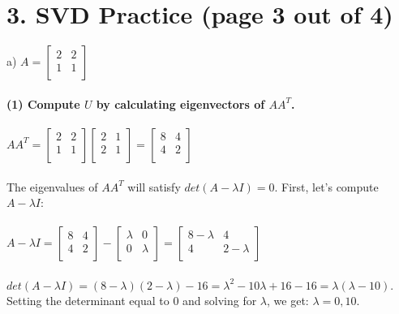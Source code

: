 \documentclass[11pt]{article}
\begin{document}
\section*{3. SVD Practice (page 3 out of 4)}
a) $ A = \begin{bmatrix}
2 & 2 \\
1 & 1 \\
\end{bmatrix} $ \\\\
\textbf{(1) Compute $U$ by calculating eigenvectors of $AA^T$.}
\\\\
$AA^T = \begin{bmatrix}
2 & 2 \\
1 & 1 \\
\end{bmatrix} \begin{bmatrix}
2 & 1 \\
2 & 1 \\
\end{bmatrix} = \begin{bmatrix}
8 & 4 \\
4 & 2 \\
\end{bmatrix} $ \\\\
The eigenvalues of $AA^T$ will satisfy $det(A - \lambda I ) = 0$. First, let's compute $A - \lambda I$: \\\\
$ A - \lambda I = \begin{bmatrix}
8 & 4 \\
4 & 2 \\
\end{bmatrix} - \begin{bmatrix}
\lambda & 0 \\
0 & \lambda \\
\end{bmatrix} = \begin{bmatrix}
8 - \lambda & 4 \\
4 & 2 - \lambda \\
\end{bmatrix}$ \\\\
$det(A - \lambda I) = (8 - \lambda) (2 - \lambda) - 16 = \lambda^2 - 10\lambda + 16 - 16 = \lambda (\lambda - 10)$. \\
Setting the determinant equal to 0 and solving for $\lambda$, we get: $\lambda = 0, 10.$ \\\\
\end{document}
